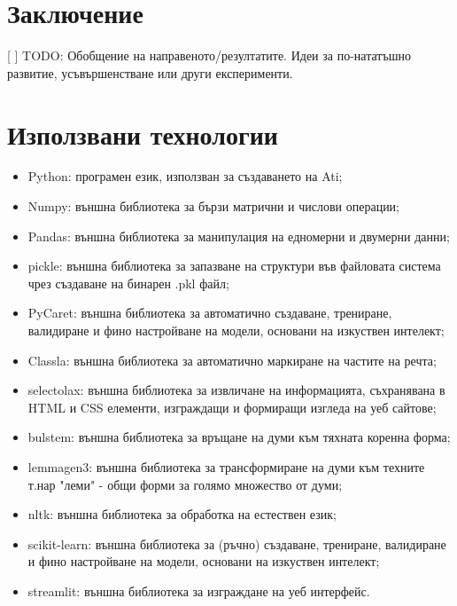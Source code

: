 \documentclass[12pt]{article}
\begin{document}

\section{Заключение}

[ ] TODO: Обобщение на направеното/резултатите. 
Идеи за по-нататъшно развитие, усъвършенстване или други експерименти.



\section{Използвани технологии}

\begin{itemize}
    \item Python: програмен език, използван за създаването на Ati;
    \item Numpy: външна библиотека за бързи матрични и числови операции;
    \item Pandas: външна библиотека за манипулация на едномерни и двумерни данни;
    \item pickle: външна библиотека за запазване на структури във файловата система чрез създаване на бинарен .pkl файл;
    \item PyCaret: външна библиотека за автоматично създаване, трениране, валидиране и фино настройване на модели, основани на изкуствен интелект;
    \item Classla: външна библиотека за автоматично маркиране на частите на речта;
    \item selectolax: външна библиотека за извличане на информацията, съхранявана в HTML и CSS елементи, изграждащи и формиращи изгледа на уеб сайтове;
    \item bulstem: външна библиотека за връщане на думи към тяхната коренна форма;
    \item lemmagen3: външна библиотека за трансформиране на думи към техните т.нар "леми" - общи форми за голямо множество от думи;
    \item nltk: външна библиотека за обработка на естествен език;
    \item scikit-learn: външна библиотека за (ръчно) създаване, трениране, валидиране и фино настройване на модели, основани на изкуствен интелект;
    \item streamlit: външна библиотека за изграждане на уеб интерфейс.
\end{itemize}
\end{document}
